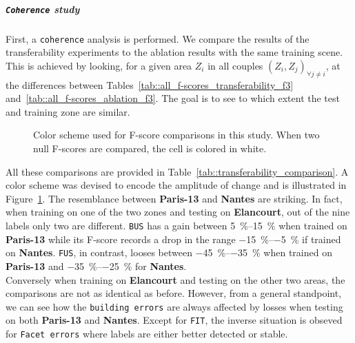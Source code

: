        \subparagraph{\texttt{Coherence} study}
            First, a \texttt{coherence} analysis is performed.
            We compare the results of the transferability experiments to the ablation results with the same training scene.
            This is achieved by looking, for a given area $Z_i$ in all couples $(Z_i, Z_j)_{\forall j \neq i}$, at the differences between Tables~\ref{tab::all_f-scores_transferability_f3} and~\ref{tab::all_f-scores_ablation_f3}.
            The goal is to see to which extent the test and training zone are similar.\\

            \begin{figure}[htb]
                \centering
                
                \caption[
                    Color scheme used for F-score comparisons in this study.
                ]{
                    \label{fig::comparison_bar}
                    Color scheme used for F-score comparisons in this study.
                    When two null F-scores are compared, the cell is colored in white.
                }
            \end{figure}

            All these comparisons are provided in Table~\ref{tab::transferability_comparison}.
            A color scheme was devised to encode the amplitude of change and is illustrated in Figure~\ref{fig::comparison_bar}.
            The resemblance between \textbf{Paris-13} and \textbf{Nantes} are striking.
            In fact, when training on one of the two zones and testing on \textbf{Elancourt}, out of the nine labels only two are different.
            \texttt{BUS} has a gain between \SIrange[range-phrase={ and }]{5}{15}{\percent} when trained on \textbf{Paris-13} while its F-score records a drop in the range \SIrange{-15}{-5}{\percent} if trained on \textbf{Nantes}.
            \texttt{FUS}, in contrast, looses between \SIrange[range-phrase={ and }]{-45}{-35}{\percent} when trained on \textbf{Paris-13} and \SIrange[range-phrase={ and }]{-35}{-25}{\percent} for \textbf{Nantes}.\\
            Conversely when training on \textbf{Elancourt} and testing on the other two areas, the comparisons are not as identical as before.
            However, from a general standpoint, we can see how the \texttt{building errors} are always affected by losses when testing on both \textbf{Paris-13} and \textbf{Nantes}.
            Except for \texttt{FIT}, the inverse situation is obseved for \texttt{Facet errors} where labels are either better detected or stable.


